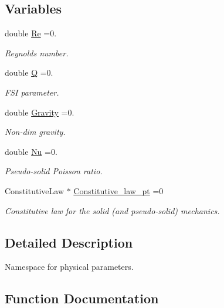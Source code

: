\subsection*{Variables}
\begin{DoxyCompactItemize}
\item 
double \hyperlink{namespaceGlobal__Parameters_a9d72e94a9305c6a310940a6a427ebe06}{Re} =0.
\begin{DoxyCompactList}\small\item\em Reynolds number. \end{DoxyCompactList}\item 
double \hyperlink{namespaceGlobal__Parameters_a7814fddf663e56168174a42d2cd6b4c1}{Q} =0.
\begin{DoxyCompactList}\small\item\em F\+SI parameter. \end{DoxyCompactList}\item 
double \hyperlink{namespaceGlobal__Parameters_a335000b5db4206486a116ae0468d2d0c}{Gravity} =0.
\begin{DoxyCompactList}\small\item\em Non-\/dim gravity. \end{DoxyCompactList}\item 
double \hyperlink{namespaceGlobal__Parameters_a20fccdcfa2c15ad8b951b9ada3bb1661}{Nu} =0.
\begin{DoxyCompactList}\small\item\em Pseudo-\/solid Poisson ratio. \end{DoxyCompactList}\item 
Constitutive\+Law $\ast$ \hyperlink{namespaceGlobal__Parameters_adbd1f040f375c96fe56b3f475f7dbec2}{Constitutive\+\_\+law\+\_\+pt} =0
\begin{DoxyCompactList}\small\item\em Constitutive law for the solid (and pseudo-\/solid) mechanics. \end{DoxyCompactList}\end{DoxyCompactItemize}


\subsection{Detailed Description}
Namespace for physical parameters. 

\subsection{Function Documentation}
\mbox{\label{namespaceGlobal__Parameters_a200109847bf4cc26da4d00e8d68d569e}} 
